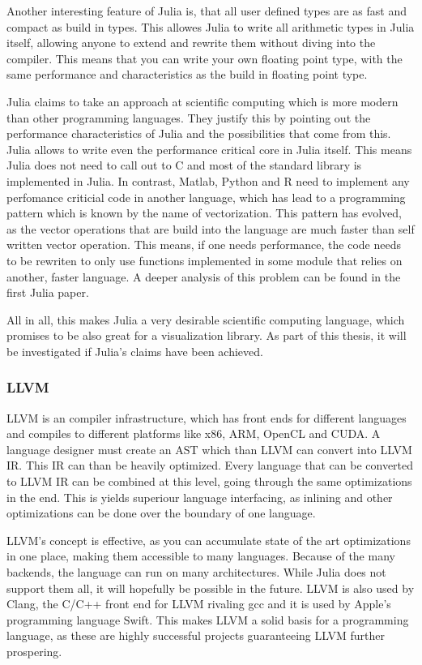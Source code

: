 Another interesting feature of Julia is, that all user defined types are as fast and compact as build in types.
This allowes Julia to write all arithmetic types in Julia itself, allowing anyone to extend and rewrite them without diving into the compiler. This means that you can write your own floating point type, with the same performance and characteristics as the build in floating point type.

Julia claims to take an approach at scientific computing which is more modern than other programming languages.
They justify this by pointing out the performance characteristics of Julia and the possibilities that come from this. 
Julia allows to write even the performance critical core in Julia itself. This means Julia does not need to call out to C and most of the standard library is implemented in Julia. 
In contrast, Matlab, Python and R need to implement any perfomance criticial code in another language, which has lead to a programming pattern which is known by the name of vectorization. This pattern has evolved, as the vector operations that are build into the language are much faster than self written vector operation.
This means, if one needs performance, the code needs to be rewriten to only use functions implemented in some module that relies on another, faster language.
A deeper analysis of this problem can be found in the first Julia paper\cite{2012arXiv1209.5145B}.

All in all, this makes Julia a very desirable scientific computing language, which promises to be also great for a visualization library.
As part of this thesis, it will be investigated if Julia's claims have been achieved.

\subsubsection{\ac{LLVM}}

\ac{LLVM} is an compiler infrastructure, which has front ends for different languages and compiles to different platforms like x86, ARM, \ac{OpenCL} and \ac{CUDA}. 
A language designer must create an \ac{AST} which than \ac{LLVM} can convert into \ac{LLVM} \ac{IR}. This \ac{IR} can than be heavily optimized. 
Every language that can be converted to \ac{LLVM} \ac{IR} can be combined at this level, going through the same optimizations in the end. This is yields superiour language interfacing, as inlining and other optimizations can be done over the boundary of one language.

\ac{LLVM}'s concept is effective, as you can accumulate state of the art optimizations in one place, making them accessible to many languages. Because of the many backends, the language can run on many architectures. While Julia does not support them all, it will hopefully be possible in the future. 
\ac{LLVM} is also used by Clang, the C/C++ front end for \ac{LLVM} rivaling \ac{gcc} and it is used by Apple's programming language Swift.
This makes \ac{LLVM} a solid basis for a programming language, as these are highly successful projects guaranteeing \ac{LLVM} further prospering.


